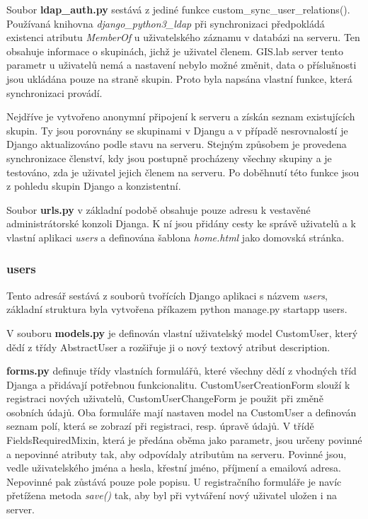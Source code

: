 Soubor \textbf{ldap\_auth.py} sestává z jediné funkce \textsf{custom\_sync\_user\_relations()}. Používaná knihovna \textit{django\_python3\_ldap} při synchronizaci předpokládá existenci atributu \textit{MemberOf} u uživatelského záznamu v databázi na  serveru. Ten obsahuje informace o skupinách, jichž je uživatel členem. GIS.lab server tento parametr u uživatelů nemá a nastavení nebylo možné změnit, data o příslušnosti jsou ukládána pouze na straně skupin. Proto byla napsána vlastní funkce, která synchronizaci provádí.

Nejdříve je vytvořeno anonymní připojení k  serveru a získán seznam existujících skupin. Ty jsou porovnány se skupinami v Djangu a v případě nesrovnalostí je Django aktualizováno podle stavu na  serveru. Stejným způsobem je provedena synchronizace členství, kdy jsou postupně procházeny všechny skupiny a je testováno, zda je uživatel jejich členem na  serveru. Po doběhnutí této funkce jsou z pohledu skupin Django a  konzistentní.

Soubor \textbf{urls.py} v základní podobě obsahuje pouze  adresu k vestavěné administrátorské konzoli Djanga. K ní jsou přidány cesty ke správě uživatelů a k vlastní aplikaci \textit{users} a definována šablona \textit{home.html} jako domovská stránka.

\subsubsection{users}

Tento adresář sestává z souborů tvořících Django aplikaci s názvem \textit{users}, základní struktura byla vytvořena příkazem \textsf{python manage.py startapp users}.

V souboru \textbf{models.py} je definován vlastní uživatelský model \textsf{CustomUser}, který dědí z třídy \textsf{AbstractUser} a rozšiřuje ji o nový textový atribut \textsf{description}.

\textbf{forms.py} definuje třídy vlastních formulářů, které všechny dědí z vhodných tříd Djanga a přidávají potřebnou funkcionalitu. \textsf{CustomUserCreationForm} slouží k registraci nových uživatelů, \textsf{CustomUserChangeForm} je použit při změně osobních údajů. Oba formuláře mají nastaven model na \textsf{CustomUser} a definován seznam polí, která se zobrazí při registraci, resp. úpravě údajů. V třídě \textsf{FieldsRequiredMixin}, která je předána oběma jako parametr, jsou určeny povinné a nepovinné atributy tak, aby odpovídaly atributům na  serveru. Povinné jsou, vedle uživatelského jména a hesla, křestní jméno, příjmení a emailová adresa. Nepovinné pak zůstává pouze pole popisu. U registračního formuláře je navíc přetížena metoda \textit{save()} tak, aby byl při vytváření nový uživatel uložen i na  server.

